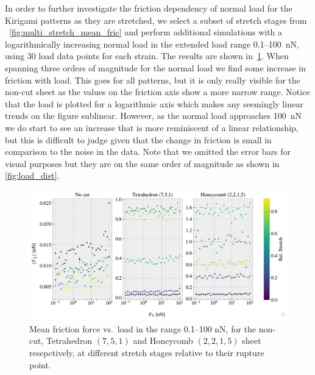 In order to further investigate the friction dependency of normal load for the Kirigami patterns as they are stretched, we select a subset of stretch stages from ~\cref{fig:multi_stretch_mean_fric} and perform additional simulations with a logarithmically increasing normal load in the extended load range 0.1--\SI{100}{nN}, using 30 load data points for each strain. The results are shown in~\cref{fig:load_dependency}. When spanning three orders of magnitude for the normal load we find some increase in friction with load. This goes for all
patterns, but it is only really visible for the non-cut sheet as the values on the friction axis show a more narrow range. Notice that the load is plotted for a logarithmic axis which makes any seemingly linear trends on the figure 
sublinear. However, as the normal load approaches \SI{100}{nN} we do start to see an increase that is more reminiscent of a linear relationship, but this is difficult to judge given that the change in friction is small in comparison to the noise in the data. Note that we omitted the error bars for visual purposes but they are on the same order of magnitude as shown in \cref{fig:load_dist}.


\begin{figure}[H]
  \centering
  \includegraphics[width=\linewidth]{figures/baseline/multi_FN_mean_compare.pdf}
  \caption{Mean friction force vs.\ load in the range 0.1--100 nN, for the non-cut, Tetrahedron $(7,5,1)$ and Honeycomb $(2,2,1,5)$ sheet resepctively, at different stretch stages relative to their rupture point. }
  \label{fig:load_dependency}
\end{figure}

